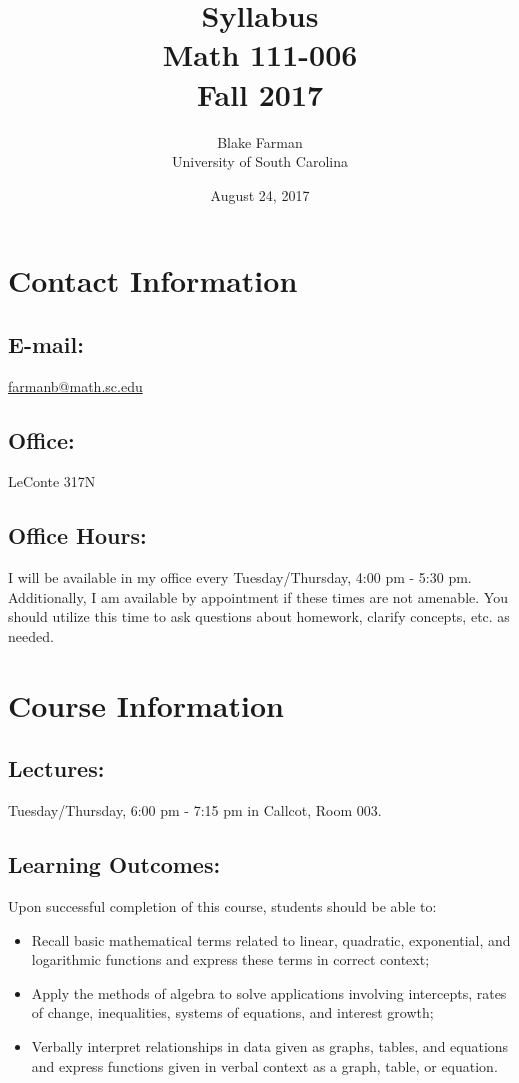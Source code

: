 \documentclass[10pt]{amsart}
\author{Blake Farman\\University of South Carolina}
\title{Syllabus\\Math 111-006\\Fall 2017}
\date{August 24, 2017}
\begin{document}
\maketitle

\section*{Contact Information}
\noindent
\subsection*{E-mail:} \href{mailto:farmanb@math.sc.edu}{farmanb@math.sc.edu}
\subsection*{Office:} LeConte 317N
\subsection*{Office Hours:}
I will be available in my office every Tuesday/Thursday, 4:00 pm - 5:30 pm.
Additionally, I am available by appointment if these times are not amenable.
You should utilize this time to ask questions about homework, clarify concepts, etc. as needed.

\section*{Course Information}
\noindent
\subsection*{Lectures:}
Tuesday/Thursday,  6:00 pm - 7:15 pm in Callcot, Room 003.

\subsection*{Learning Outcomes:} Upon successful completion of this course, students should be able to:
\begin{itemize}
\item
  Recall basic mathematical terms related to linear, quadratic, exponential, and logarithmic functions and express these terms in correct context;
\item
  Apply the methods of algebra to solve applications involving intercepts, rates of change, inequalities, systems of equations, and interest growth;
\item
  Verbally interpret relationships in data given as graphs, tables, and equations and express functions given in verbal context as a graph, table, or equation.
\end{itemize}
\end{document}
